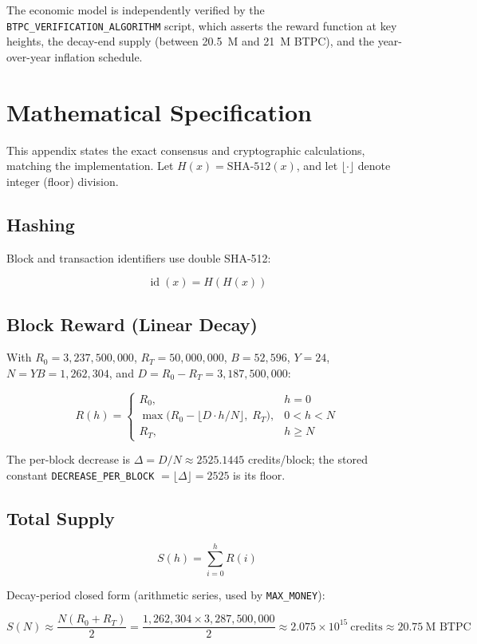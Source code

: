 \documentclass[11pt,a4paper]{article}
\begin{document}
The economic model is independently verified by the \texttt{BTPC\_VERIFICATION\_ALGORITHM} script, which asserts the reward function at key heights, the decay-end supply (between 20.5~M and 21~M BTPC), and the year-over-year inflation schedule.

\section{Mathematical Specification}

This appendix states the exact consensus and cryptographic calculations, matching the implementation. Let $H(x) = \text{SHA-512}(x)$, and let $\lfloor \cdot \rfloor$ denote integer (floor) division.

\subsection{Hashing}

Block and transaction identifiers use double SHA-512:

\[
\operatorname{id}(x) = H(H(x))
\]

\subsection{Block Reward (Linear Decay)}

With $R_0 = 3{,}237{,}500{,}000$, $R_T = 50{,}000{,}000$, $B = 52{,}596$, $Y = 24$, $N = YB = 1{,}262{,}304$, and $D = R_0 - R_T = 3{,}187{,}500{,}000$:

\[
R(h) =
\begin{cases}
R_0, & h = 0 \\
\max\bigl(R_0 - \lfloor D \cdot h / N \rfloor,\; R_T\bigr), & 0 < h < N \\
R_T, & h \ge N
\end{cases}
\]

The per-block decrease is $\Delta = D/N \approx 2525.1445$ credits/block; the stored constant \texttt{DECREASE\_PER\_BLOCK} $= \lfloor \Delta \rfloor = 2525$ is its floor.

\subsection{Total Supply}

\[
S(h) = \sum_{i=0}^{h} R(i)
\]

Decay-period closed form (arithmetic series, used by \texttt{MAX\_MONEY}):

\[
S(N) \approx \frac{N (R_0 + R_T)}{2} = \frac{1{,}262{,}304 \times 3{,}287{,}500{,}000}{2} \approx 2.075 \times 10^{15}\ \text{credits} \approx 20.75\ \text{M BTPC}
\]
\end{document}
